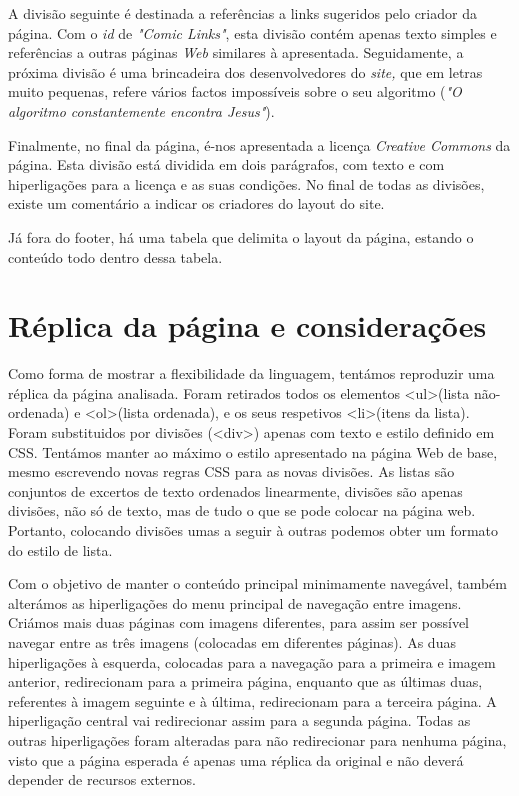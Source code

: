 \documentclass[11pt,openright,twoside]{report}
\begin{document}
A divisão seguinte é destinada a referências a links sugeridos pelo criador da página. Com o \textit{id} de \textit{"Comic Links"}, esta divisão contém apenas texto simples e referências a outras páginas \textit{Web} similares à apresentada. Seguidamente, a próxima divisão é uma brincadeira dos desenvolvedores do \textit{site,} que em letras muito pequenas, refere vários factos impossíveis sobre o seu algoritmo (\textit{"O algoritmo constantemente encontra Jesus"}).
\smallskip 

Finalmente, no final da página, é-nos apresentada a licença \textit{Creative Commons} da página. Esta divisão está dividida em dois parágrafos, com texto e com hiperligações para a licença e as suas condições. No final de todas as divisões, existe um comentário a indicar os criadores do layout do site.
\smallskip 

Já fora do footer, há uma tabela que delimita o layout da página, estando o conteúdo todo dentro dessa tabela.


\chapter{Réplica da página e considerações}

Como forma de mostrar a flexibilidade da linguagem, tentámos reproduzir uma réplica da página analisada. Foram retirados todos os elementos \textless ul\textgreater  (lista não-ordenada) e \textless ol\textgreater  (lista ordenada), e os seus respetivos \textless li\textgreater (itens da lista). Foram substituidos por divisões (\textless div\textgreater) apenas com texto e estilo definido em CSS. Tentámos manter ao máximo o estilo apresentado na página Web de base, mesmo escrevendo novas regras CSS para as novas divisões. As listas são conjuntos de excertos de texto ordenados linearmente, divisões são apenas divisões, não só de texto, mas de tudo o que se pode colocar na página web. Portanto, colocando divisões umas a seguir à outras podemos obter um formato do estilo de lista.
\smallskip 

Com o objetivo de manter o conteúdo principal minimamente navegável, também alterámos as hiperligações do menu principal de navegação entre imagens. Criámos mais duas páginas com imagens diferentes, para assim ser possível navegar entre as três imagens (colocadas em diferentes páginas).  As duas hiperligações à esquerda, colocadas para a navegação para a primeira e imagem anterior, redirecionam para a primeira página, enquanto que as últimas duas, referentes à imagem seguinte e à última, redirecionam para a terceira página. A hiperligação central vai redirecionar assim para a segunda página. Todas as outras hiperligações foram alteradas para não redirecionar para nenhuma página, visto que a página esperada é apenas uma réplica da original e não deverá depender de recursos externos. 
\smallskip
\end{document}
